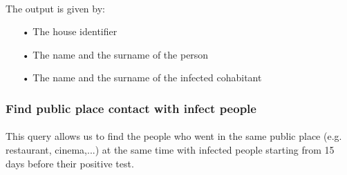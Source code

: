 \documentclass[a4paper,12pt]{article}
\begin{document}
\paragraph{} The output is given by: 
\begin{itemize}
\item[•] The house identifier
\item[•] The name and the surname of the person
\item[•] The name and the surname of the infected cohabitant
\begin{center}
\end{center}
\end{itemize}
\subsubsection{Find public place contact with infect people}
\paragraph{} This query allows us to find the people who went in the same public place (e.g. restaurant, cinema,...) at the same time with infected people starting from 15 days before their positive test.
\begin{center}
\end{center}
\end{document}
